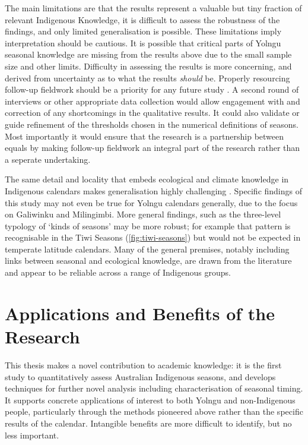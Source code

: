 The main limitations are that the results represent a valuable but tiny fraction
of relevant Indigenous Knowledge, it is difficult to assess the robustness
of the findings, and only limited generalisation is possible.  These
limitations imply interpretation should be cautious.  It is possible that
critical parts of Yolngu seasonal knowledge are missing from the results
above due to the small sample size and other limits.
%
Difficulty in assessing the results is more concerning, and derived from
uncertainty as to what the results \textit{should} be.   Properly resourcing
follow-up fieldwork should be a priority for any future study
\citep[see eg.][on engagemnt plans]{jackson2015}.  A second round
of interviews or other appropriate data collection would allow engagement
with and correction of any shortcomings in the qualitative results.
It could also validate or guide refinement of the thresholds chosen in the
numerical definitions of seasons.  Most importantly it would
ensure that the research is a partnership between equals by making follow-up
fieldwork an integral part of the research rather than a seperate undertaking.

The same detail and locality that embeds ecological and climate knowledge in
Indigenous calendars makes generalisation highly challenging
\citep[][came to similar conclusions]{barber2005,davis1989}.  Specific
findings of this study may not even be true for Yolngu calendars generally,
due to the focus on Galiwinku and Milingimbi.  More general findings, such as
the three-level typology of `kinds of seasons' may be more robust; for example
that pattern is recognisable in the Tiwi Seasons (\cref{fig:tiwi-seasons})
but would not be expected in temperate latitude calendars.  Many of the general premises, notably
including links between seasonal and ecological knowledge, are drawn from the
literature and appear to be reliable across a range of Indigenous groups.




\section{Applications and Benefits of the Research}
\label{sec:applications-benefits}

This thesis makes a novel contribution to academic knowledge: it is the
first study to quantitatively assess Australian Indigenous seasons, and
develops techniques for further novel analysis including characterisation
of seasonal timing.
%
It supports concrete applications of interest to both Yolngu and
non-Indigenous people, particularly through the methods pioneered above
rather than the specific results of the calendar.  Intangible benefits
are more difficult to identify, but no less important.


